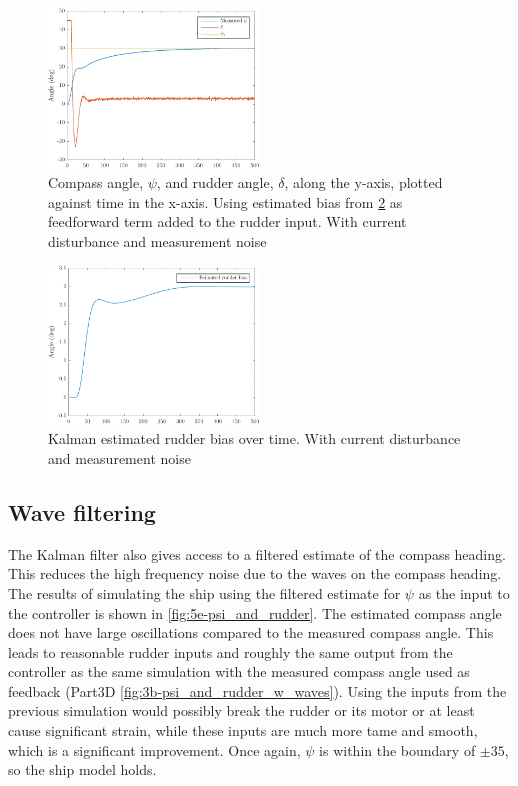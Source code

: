 \begin{figure}[h!]
    \centering
    \includegraphics[width=0.5\textwidth]{images/5d-psi_and_rudder}
    \caption{Compass angle, $\psi$, and rudder angle, $\delta$, along the y-axis, plotted against time in the x-axis. Using estimated bias from \cref{fig:5d-estimated_rudder_bias} as feedforward term added to the rudder input. With current disturbance and measurement noise}
    \label{fig:5d-psi_and_rudder}
\end{figure}

\begin{figure}[h!]
    \centering
    \includegraphics[width=0.5\textwidth]{images/5d-estimated_rudder_bias}
    \caption{Kalman estimated rudder bias over time. With current disturbance and measurement noise}
    \label{fig:5d-estimated_rudder_bias}
\end{figure}

\subsection{Wave filtering}
The Kalman filter also gives access to a filtered estimate of the compass heading. This reduces the high frequency noise due to the waves on the compass heading. The results of simulating the ship using the filtered estimate for $\psi$ as the input to the controller is shown in \cref{fig:5e-psi_and_rudder}. The estimated compass angle does not have large oscillations compared to the measured compass angle. This leads to reasonable rudder inputs and roughly the same output from the controller as the same simulation with the measured compass angle used as feedback (Part3D \cref{fig:3b-psi_and_rudder_w_waves}). Using the inputs from the previous simulation would possibly break the rudder or its motor or at least cause significant strain, while these inputs are much more tame and smooth, which is a significant improvement. Once again, $\psi$ is within the boundary of $\pm35$, so the ship model holds.

